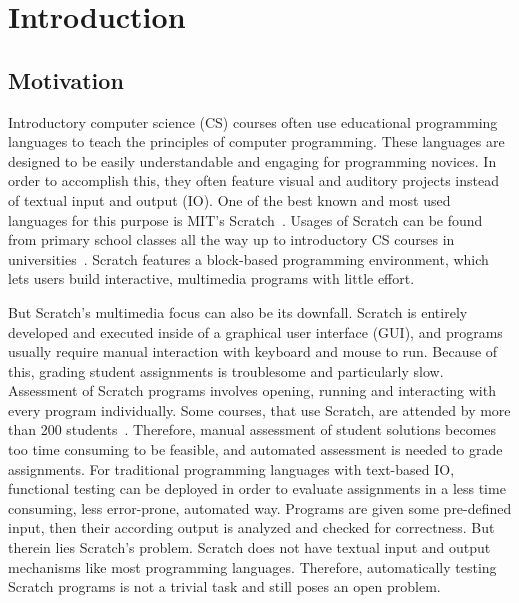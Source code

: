 \chapter{Introduction}

\section{Motivation}

Introductory computer science (CS) courses often use educational programming languages to teach the principles of computer programming.
These languages are designed to be easily understandable and engaging for programming novices.
In order to accomplish this, they often feature visual and auditory projects instead of textual input and output (IO).
One of the best known and most used languages for this purpose is MIT's Scratch~\cite{scratch, scratchproject}.
Usages of Scratch can be found from primary school classes all the way up to introductory CS courses in universities~\cite{itch}.
Scratch features a block-based programming environment, which lets users build interactive, multimedia programs with little effort.
\parspace

But Scratch's multimedia focus can also be its downfall.
Scratch is entirely developed and executed inside of a graphical user interface (GUI), and programs usually require manual interaction with keyboard and mouse to run.
Because of this, grading student assignments is troublesome and particularly slow.
Assessment of Scratch programs involves opening, running and interacting with every program individually.
Some courses, that use Scratch, are attended by more than 200 students~\cite{itch}.
Therefore, manual assessment of student solutions becomes too time consuming to be feasible, and automated assessment is needed to grade assignments.
For traditional programming languages with text-based IO, functional testing can be deployed in order to evaluate assignments in a less time consuming, less error-prone, automated way.
Programs are given some pre-defined input, then their according output is analyzed and checked for correctness.
But therein lies Scratch's problem.
Scratch does not have textual input and output mechanisms like most programming languages.
Therefore, automatically testing Scratch programs is not a trivial task and still poses an open problem.
\parspace


